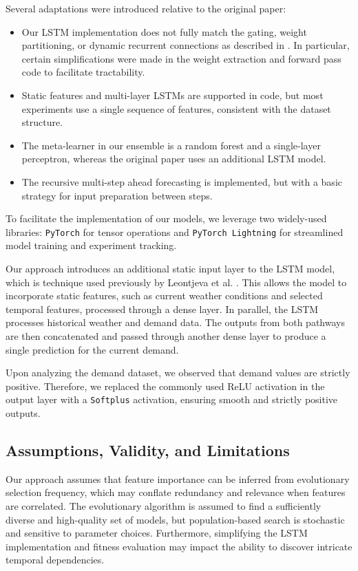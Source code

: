 \documentclass[12pt]{article}
\begin{document}
Several adaptations were introduced relative to the original paper:
\begin{itemize}
    \item Our LSTM implementation does not fully match the gating, weight partitioning, or dynamic recurrent connections as described in \cite{espinosa2023embeddedfeatureselectionlstm}. In particular, certain simplifications were made in the weight extraction and forward pass code to facilitate tractability.
    \item Static features and multi-layer LSTMs are supported in code, but most experiments use a single sequence of features, consistent with the dataset structure.
    \item The meta-learner in our ensemble is a random forest and a single-layer perceptron, whereas the original paper uses an additional LSTM model.
    \item The recursive multi-step ahead forecasting is implemented, but with a basic strategy for input preparation between steps.
\end{itemize}

To facilitate the implementation of our models, we leverage two widely-used libraries: \texttt{PyTorch} for tensor operations and \texttt{PyTorch Lightning} for streamlined model training and experiment tracking.

Our approach introduces an additional static input layer to the LSTM model, which is technique used previously by Leontjeva et al. \cite{Leontjeva_2016}. This allows the model to incorporate static features, such as current weather conditions and selected temporal features, processed through a dense layer. In parallel, the LSTM processes historical weather and demand data. The outputs from both pathways are then concatenated and passed through another dense layer to produce a single prediction for the current demand.

Upon analyzing the demand dataset, we observed that demand values are strictly positive. Therefore, we replaced the commonly used ReLU activation in the output layer with a \texttt{Softplus} activation, ensuring smooth and strictly positive outputs.

\subsection{Assumptions, Validity, and Limitations}

Our approach assumes that feature importance can be inferred from evolutionary selection frequency, which may conflate redundancy and relevance when features are correlated. The evolutionary algorithm is assumed to find a sufficiently diverse and high-quality set of models, but population-based search is stochastic and sensitive to parameter choices. Furthermore, simplifying the LSTM implementation and fitness evaluation may impact the ability to discover intricate temporal dependencies.
\end{document}
